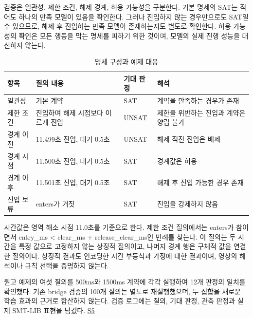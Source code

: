 \documentclass[10pt,a4paper,twocolumn]{article}\usepackage[margin=18mm]{geometry}\usepackage{fontspec,kotex}
\begin{document}
검증은 일관성, 제한 조건, 해제 경계, 허용 가능성을 구분한다. 기본 명세의 SAT는 적어도 하나의 만족 모델이 있음을 확인한다. 그러나 진입하지 않는 경우만으로도 SAT일 수 있으므로, 해제 후 진입하는 만족 모델이 존재하는지도 별도로 확인한다. 허용 가능성의 확인은 모든 행동을 막는 명세를 피하기 위한 것이며, 모델의 실제 진행 성능을 대신하지 않는다.\par

\begin{table}[tp]\caption{명세 구성과 예제 대응}
\centering\fontsize{8}{10}\selectfont\setlength{\tabcolsep}{3pt}
\begin{tabular}{@{}>{\raggedright\arraybackslash}p{}>{\raggedright\arraybackslash}p{}>{\raggedright\arraybackslash}p{}>{\raggedright\arraybackslash}p{}@{}}
\toprule
\textbf{항목} & \textbf{질의 내용} & \textbf{기대 판정} & \textbf{해석}\\
\midrule
일관성 & 기본 계약 & SAT & 계약을 만족하는 경우가 존재\\[3pt]
제한 조건 & 진입하며 해제 시점보다 이르게 진입 & UNSAT & 제한을 위반하는 진입과 계약은 양립 불가\\[3pt]
경계 이전 & 11.499초 진입, 대기 0.5초 & UNSAT & 해제 직전 진입은 배제\\[3pt]
경계 시점 & 11.500초 진입, 대기 0.5초 & SAT & 경계값은 허용\\[3pt]
경계 이후 & 11.501초 진입, 대기 0.5초 & SAT & 해제 후 진입 가능한 경우 존재\\[3pt]
진입 보류 & enters가 거짓 & SAT & 진입을 강제하지 않음\\[3pt]
\bottomrule\end{tabular}
\end{table}

시간값은 영역 해소 시점 11.0초를 기준으로 한다. 제한 조건 질의에서는 {\ttfamily{}\selectfont\footnotesize enters}가 참이면서 {\ttfamily{}\selectfont\footnotesize entry\_\allowbreak ms < clear\_\allowbreak ms + release\_\allowbreak clear\_\allowbreak ms}인 반례를 찾는다. 이 질의는 두 시간을 특정 값으로 고정하지 않는 상징적 질의이고, 나머지 경계 행은 구체적 값을 연결한 질의이다. 상징적 결과도 인코딩한 시간 부등식과 가정에 대한 결과이며, 영상의 해석이나 규칙 선택을 증명하지 않는다.\par

원고 예제의 여섯 질의를 500ms와 1500ms 계약에 각각 실행하여 12개 판정의 일치를 확인했다. 기존 bridge 검증의 100개 질의는 별도로 재실행했으며, 두 집합을 새로운 학습 효과의 근거로 합산하지 않는다. 검증 로그에는 질의, 기대 판정, 관측 판정과 실제 SMT-LIB 표현을 남겼다. \href{\detokenize{projects/04-guardsynth-coc/artifacts/public/paper1-method-preservation-001/methodology-2026-09-30-001/manuscript_examples.json}}{S5}\par
\end{document}
